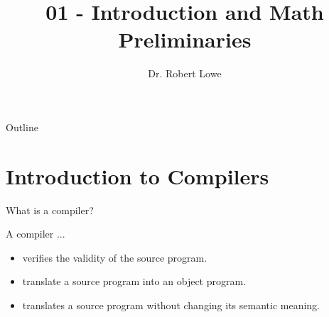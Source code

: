 \documentclass{beamer}
\title{01 - Introduction and Math Preliminaries}
\author{Dr. Robert Lowe\\}
\institute[Maryville College] %
{
  Division of Mathematics and Computer Science\\
  Maryville College
}
\date[]{}
\begin{document}
\begin{frame}
  \titlepage
\end{frame}

\begin{frame}{Outline}
  \tableofcontents
\end{frame}





\section{Introduction to Compilers}

\begin{frame}{What is a compiler?}
    
    A compiler ...
    \begin{itemize}[<+(1)->]
       \item verifies the validity of the source program.
       \item translate a source program into an object program.
       \item translates a source program without changing its semantic meaning.
    \end{itemize}
\end{frame}
\end{document}

